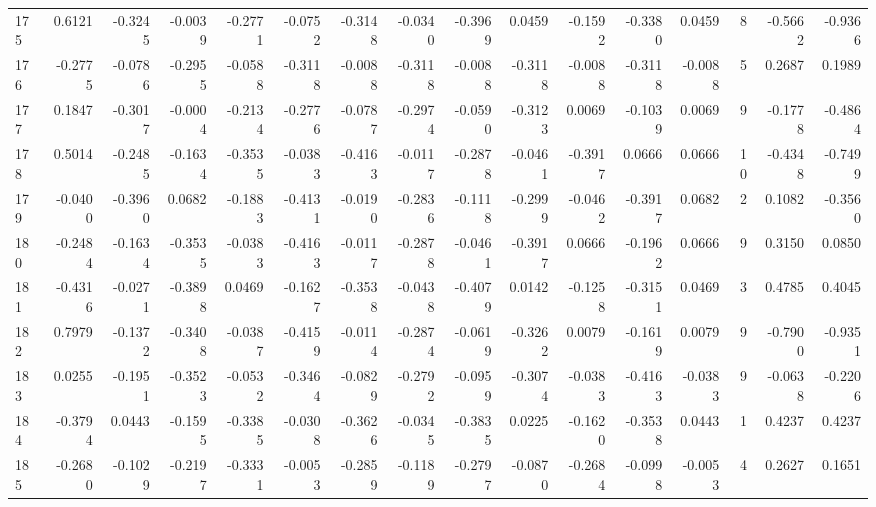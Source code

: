 \begin{tabular}{lrrrrrrrrrrrrrrr}
175 &      0.6121 & -0.3245 & -0.0039 & -0.2771 & -0.0752 & -0.3148 & -0.0340 & -0.3969 &  0.0459 & -0.1592 &  -0.3380 &     0.0459 &      8 &                   -0.5662 &                    -0.9366 \\
176 &     -0.2775 & -0.0786 & -0.2955 & -0.0588 & -0.3118 & -0.0088 & -0.3118 & -0.0088 & -0.3118 & -0.0088 &  -0.3118 &    -0.0088 &      5 &                    0.2687 &                     0.1989 \\
177 &      0.1847 & -0.3017 & -0.0004 & -0.2134 & -0.2776 & -0.0787 & -0.2974 & -0.0590 & -0.3123 &  0.0069 &  -0.1039 &     0.0069 &      9 &                   -0.1778 &                    -0.4864 \\
178 &      0.5014 & -0.2485 & -0.1634 & -0.3535 & -0.0383 & -0.4163 & -0.0117 & -0.2878 & -0.0461 & -0.3917 &   0.0666 &     0.0666 &     10 &                   -0.4348 &                    -0.7499 \\
179 &     -0.0400 & -0.3960 &  0.0682 & -0.1883 & -0.4131 & -0.0190 & -0.2836 & -0.1118 & -0.2999 & -0.0462 &  -0.3917 &     0.0682 &      2 &                    0.1082 &                    -0.3560 \\
180 &     -0.2484 & -0.1634 & -0.3535 & -0.0383 & -0.4163 & -0.0117 & -0.2878 & -0.0461 & -0.3917 &  0.0666 &  -0.1962 &     0.0666 &      9 &                    0.3150 &                     0.0850 \\
181 &     -0.4316 & -0.0271 & -0.3898 &  0.0469 & -0.1627 & -0.3538 & -0.0438 & -0.4079 &  0.0142 & -0.1258 &  -0.3151 &     0.0469 &      3 &                    0.4785 &                     0.4045 \\
182 &      0.7979 & -0.1372 & -0.3408 & -0.0387 & -0.4159 & -0.0114 & -0.2874 & -0.0619 & -0.3262 &  0.0079 &  -0.1619 &     0.0079 &      9 &                   -0.7900 &                    -0.9351 \\
183 &      0.0255 & -0.1951 & -0.3523 & -0.0532 & -0.3464 & -0.0829 & -0.2792 & -0.0959 & -0.3074 & -0.0383 &  -0.4163 &    -0.0383 &      9 &                   -0.0638 &                    -0.2206 \\
184 &     -0.3794 &  0.0443 & -0.1595 & -0.3385 & -0.0308 & -0.3626 & -0.0345 & -0.3835 &  0.0225 & -0.1620 &  -0.3538 &     0.0443 &      1 &                    0.4237 &                     0.4237 \\
185 &     -0.2680 & -0.1029 & -0.2197 & -0.3331 & -0.0053 & -0.2859 & -0.1189 & -0.2797 & -0.0870 & -0.2684 &  -0.0998 &    -0.0053 &      4 &                    0.2627 &                     0.1651 \\

\end{tabular}
